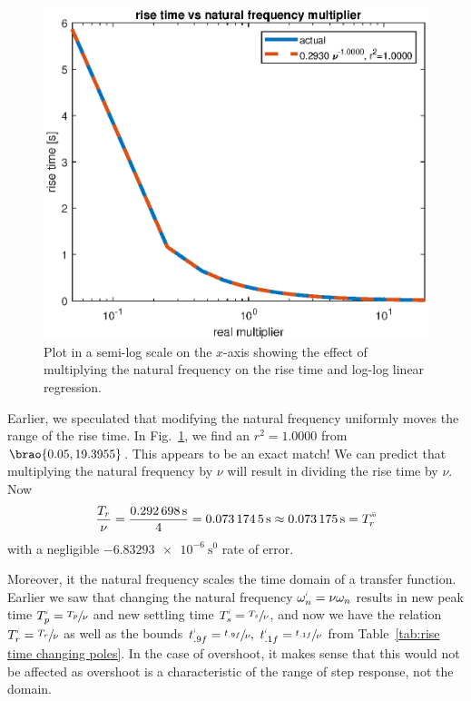 \documentclass[12pt]{article}
\DeclarePairedDelimiter\brao()%
\newcommand{\setprime}[2][1]{%
    {#2}^{%
        \raisebox{1pt}{%
            \scalebox{0.5}{%
                \itshape\sffamily\uppercase%
                \expandafter{%
                    \romannumeral#1%
                }%
            }%
        }
    }%
}%
\begin{document}
\begin{figure}
    \centering
    \includegraphics[width=\linewidth]{img/part01_rise_time_vs_wn.eps}
    \caption{Plot in a semi-log scale on the $x$-axis
    showing the effect of multiplying the natural frequency on the rise time and log-log linear regression.}
    \label{fig:rise time vs wn}
\end{figure}

Earlier, we speculated that modifying the natural frequency uniformly moves the range of the rise time.
In Fig.~\ref{fig:rise time vs wn}, we find an $r^2 = 1.0000$ from $\brao{0.05, 19.3955}$.
This appears to be an exact match!
We can predict that multiplying the natural frequency by $\nu$ will result in dividing the rise time by $\nu$.
Now
\begin{equation}
    \frac{T_r}\nu = \frac{\SI{0.292698}\second}4 = \SI{0.0731745}\second \approx \SI{0.073175}\second = \setprime[3]{T}_r
\end{equation}
with a negligible $\SI{-6.83293e-6}{\second^0}$ rate of error.

Moreover, it the natural frequency
scales the time domain
of a transfer function.
Earlier we saw that changing the natural frequency $\setprime\omega_n = \nu\omega_n$ results in
new peak time $\setprime{T}_p = \sfrac{T_p}\nu$ and
new settling time $\setprime{T}_s = \sfrac{T_s}\nu$,
and now we have the relation $\setprime{T}_r = \sfrac{T_r}\nu$
as well as the bounds $\setprime{t}_{.9f} = \sfrac{t_{.9f}}\nu,\ \setprime{t}_{.1f} = \sfrac{t_{.1f}}\nu$
from Table~\ref{tab:rise time changing poles}.
In the case of overshoot, it makes sense that this would not be affected
as overshoot is a characteristic of the range of step response, not the domain.
\end{document}
